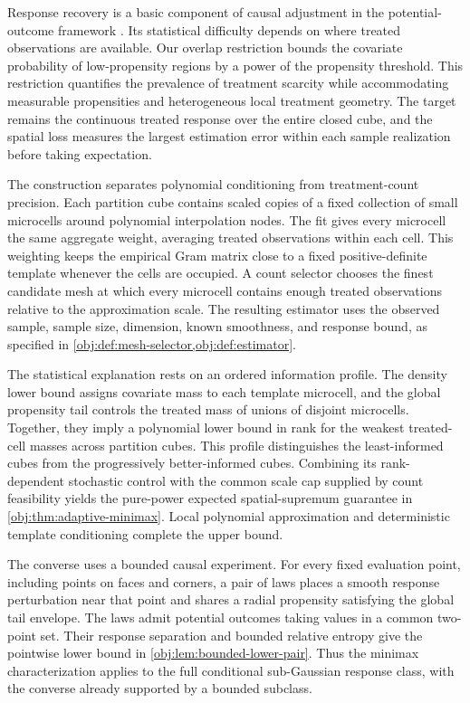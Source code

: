 \documentclass[11pt]{article}
\begin{document}
Response recovery is a basic component of causal adjustment in the potential-outcome framework \citep{rubin1974,rosenbaum1983,imbens2015}. Its statistical difficulty depends on where treated observations are available. Our overlap restriction bounds the covariate probability of low-propensity regions by a power of the propensity threshold. This restriction quantifies the prevalence of treatment scarcity while accommodating measurable propensities and heterogeneous local treatment geometry. The target remains the continuous treated response over the entire closed cube, and the spatial loss measures the largest estimation error within each sample realization before taking expectation.

The construction separates polynomial conditioning from treatment-count precision. Each partition cube contains scaled copies of a fixed collection of small microcells around polynomial interpolation nodes. The fit gives every microcell the same aggregate weight, averaging treated observations within each cell. This weighting keeps the empirical Gram matrix close to a fixed positive-definite template whenever the cells are occupied. A count selector chooses the finest candidate mesh at which every microcell contains enough treated observations relative to the approximation scale. The resulting estimator uses the observed sample, sample size, dimension, known smoothness, and response bound, as specified in \cref{obj:def:mesh-selector,obj:def:estimator}.

The statistical explanation rests on an ordered information profile. The density lower bound assigns covariate mass to each template microcell, and the global propensity tail controls the treated mass of unions of disjoint microcells. Together, they imply a polynomial lower bound in rank for the weakest treated-cell masses across partition cubes. This profile distinguishes the least-informed cubes from the progressively better-informed cubes. Combining its rank-dependent stochastic control with the common scale cap supplied by count feasibility yields the pure-power expected spatial-supremum guarantee in \cref{obj:thm:adaptive-minimax}. Local polynomial approximation and deterministic template conditioning complete the upper bound.

The converse uses a bounded causal experiment. For every fixed evaluation point, including points on faces and corners, a pair of laws places a smooth response perturbation near that point and shares a radial propensity satisfying the global tail envelope. The laws admit potential outcomes taking values in a common two-point set. Their response separation and bounded relative entropy give the pointwise lower bound in \cref{obj:lem:bounded-lower-pair}. Thus the minimax characterization applies to the full conditional sub-Gaussian response class, with the converse already supported by a bounded subclass.
\end{document}
